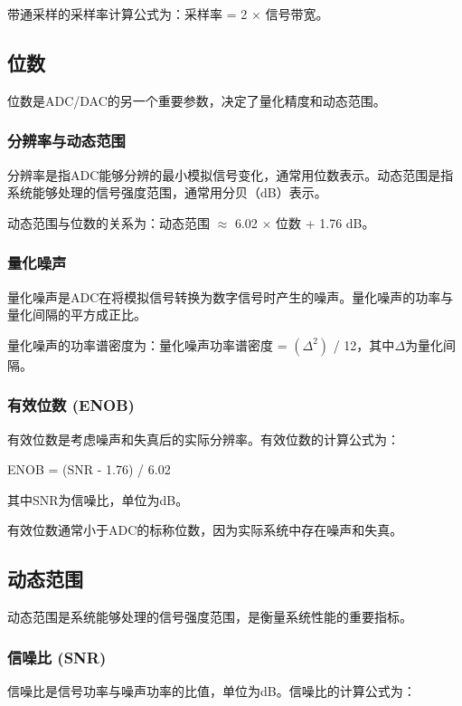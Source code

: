 ﻿\documentclass[UTF8]{ctexbook}
\begin{document}
带通采样的采样率计算公式为：采样率 = 2 × 信号带宽。

\subsection{位数}

位数是ADC/DAC的另一个重要参数，决定了量化精度和动态范围。

\subsubsection{分辨率与动态范围}

分辨率是指ADC能够分辨的最小模拟信号变化，通常用位数表示。动态范围是指系统能够处理的信号强度范围，通常用分贝（dB）表示。

动态范围与位数的关系为：动态范围 \(\approx\) 6.02 × 位数 + 1.76 dB。

\subsubsection{量化噪声}

量化噪声是ADC在将模拟信号转换为数字信号时产生的噪声。量化噪声的功率与量化间隔的平方成正比。

量化噪声的功率谱密度为：量化噪声功率谱密度 = $(\Delta^2)$ / 12，其中\(\Delta\)为量化间隔。

\subsubsection{有效位数 (ENOB)}

有效位数是考虑噪声和失真后的实际分辨率。有效位数的计算公式为：

ENOB = (SNR - 1.76) / 6.02

其中SNR为信噪比，单位为dB。

有效位数通常小于ADC的标称位数，因为实际系统中存在噪声和失真。

\subsection{动态范围}

动态范围是系统能够处理的信号强度范围，是衡量系统性能的重要指标。

\subsubsection{信噪比 (SNR)}

信噪比是信号功率与噪声功率的比值，单位为dB。信噪比的计算公式为：
\end{document}
